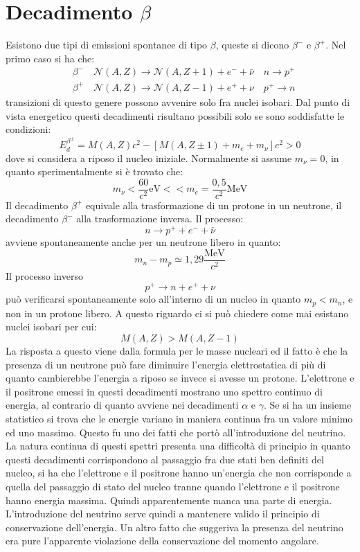 \section{Decadimento $\beta$}
Esistono due tipi di emissioni spontanee di tipo $\beta$, 
queste si dicono $\beta^-$ e $\beta^+$.
Nel primo caso si ha che:
\begin{align*}
&\beta^-\quad \mathcal{N}(A,Z)\rightarrow\mathcal{N}(A,Z+1)+e^-+\bar{\nu}\quad 
n\rightarrow p^+\\
&\beta^+\quad \mathcal{N}(A,Z)\rightarrow\mathcal{N}(A,Z-1)+e^++\nu\quad 
p^+\rightarrow n
\end{align*}
transizioni di questo genere possono avvenire solo fra nuclei isobari.
Dal punto di vista energetico questi decadimenti risultano possibili solo se 
sono soddisfatte le condizioni:
\[
E_d^{\beta^{\pm}}=M(A,Z)c^2-[M(A,Z\pm1)+m_e+m_{\nu}]c^2>0
\]
dove si considera a riposo il nucleo iniziale. Normalmente si assume 
$m_{\nu}=0$, in quanto sperimentalmente si è trovato che:
\[
m_{\nu}<\frac{60}{c^2}\si{\electronvolt}<<m_e=\frac{0,5}{c^2}
\si{\mega\electronvolt}
\]
Il decadimento $\beta^+$ equivale alla trasformazione di un protone in un 
neutrone, il decadimento $\beta^-$ alla trasformazione inversa.
Il processo:
\[
n\rightarrow p^++e^-+\bar{\nu}
\]
avviene spontaneamente anche per un neutrone libero in quanto:
\[
m_n-m_p\simeq1,29\frac{\si{\mega\electronvolt}}{c^2}
\]
Il processo inverso
\[
p^+\rightarrow n+e^++\nu
\]
può verificarsi spontaneamente solo all'interno di un nucleo in quanto 
$m_p<m_n$, e non in un protone libero. A questo riguardo ci si può chiedere
come mai esistano nuclei isobari per cui:
\[
M(A,Z)>M(A,Z-1)
\]
La risposta a questo viene dalla formula  per le masse nucleari ed il fatto è 
che la presenza di un neutrone può fare diminuire l'energia elettrostatica di 
più di
quanto cambierebbe l'energia a riposo se invece si avesse un protone. 
L'elettrone e il positrone emessi in questi decadimenti mostrano uno spettro 
continuo di energia,
al contrario di quanto avviene nei decadimenti $\alpha$ e $\gamma$. Se si ha un 
insieme statistico si trova che le energie variano in maniera continua fra un 
valore minimo
ed uno massimo. Questo fu uno dei fatti che portò all'introduzione del 
neutrino. La natura continua di questi spettri presenta una difficoltà di 
principio in quanto
questi decadimenti corrispondono al passaggio fra due stati ben definiti del 
nucleo, si ha che l'elettrone e il positrone hanno un'energia che non
corrisponde a quella del passaggio di stato del nucleo tranne quando 
l'elettrone e il positrone hanno energia massima.
Quindi apparentemente manca una parte di energia. L'introduzione del neutrino 
serve quindi a mantenere valido il principio di conservazione dell'energia.
Un altro fatto che suggeriva la presenza del neutrino era pure l'apparente 
violazione della conservazione del momento angolare.


